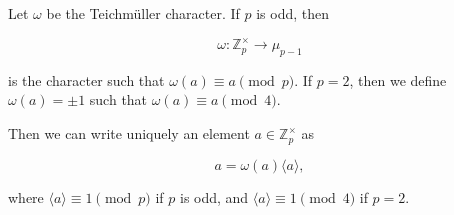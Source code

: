 Let $\omega$ be the Teichmüller character. If $p$ is odd, then

$$\omega: \mathbb{Z}_p^{\times} \to \mu_{p-1}$$

is the character such that $\omega(a) \equiv a \pmod{p}$. If $p = 2$, then we define $\omega(a) = \pm 1$ such that $\omega(a) \equiv a \pmod{4}$.

Then we can write uniquely an element $a \in \mathbb{Z}_p^{\times}$ as

$$a = \omega(a)\langle a \rangle,$$

where $\langle a \rangle \equiv 1 \pmod{p}$ if $p$ is odd, and $\langle a \rangle \equiv 1 \pmod{4}$ if $p = 2$.
